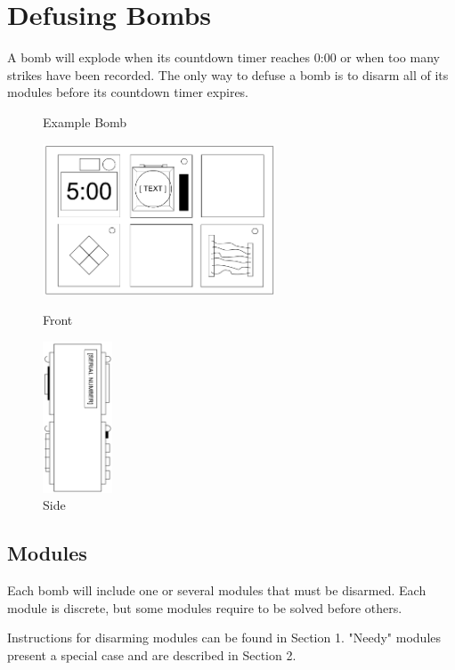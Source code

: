 
\section*{Defusing Bombs}
A bomb will explode when its countdown timer reaches 0:00 or when too
many strikes have been recorded. The only way to defuse a bomb is to disarm
all of its modules before its countdown timer expires.

\begin{figure}[h]
  \centering
  \caption*{Example Bomb}
  \begin{minipage}{.4\textwidth}
    \centering
    \includegraphics[height=4.5cm]{modules/0_explanation/bomb_front}
    \caption*{Front}
    \label{fig:sub1}
  \end{minipage}%
  \begin{minipage}{.3\textwidth}
    \centering
    \includegraphics[height=4.5cm]{modules/0_explanation/bomb_side}
    \caption*{Side}
    \label{fig:sub2}
  \end{minipage}
  \label{fig:example_bomb}
\end{figure}

\subsection*{Modules}
Each bomb will include one or several modules that must be disarmed. Each
module is discrete, but some modules require to be solved before others.


Instructions for disarming modules can be found in Section 1.
"Needy" modules present a special case and are described in Section 2.

